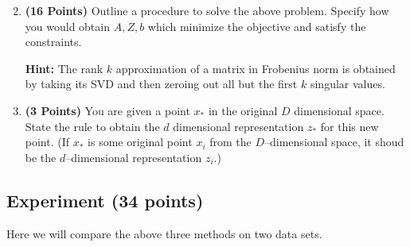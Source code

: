 \documentclass[a4paper]{article}
\theoremstyle{definition}
\begin{document}
\begin{enumerate}
	\setcounter{enumi}{1}
	\item \textbf{(16 Points)}
	      Outline a procedure to solve the above problem. Specify how you
	      would obtain $A, Z, b$ which minimize the objective and satisfy the constraints.

	      \textbf{Hint: }The rank $k$ approximation of a matrix in Frobenius norm is obtained by
	      taking its SVD and then zeroing out all but the first $k$ singular values.

	\item \textbf{(3 Points)}
	      You are given a point $x_*$ in the original $D$ dimensional space.
	      State the rule to obtain the $d$ dimensional
	      representation $z_*$ for this new point.
	      (If $x_*$ is some original point $x_i$ from the $D$--dimensional space, it shoud be the
	      $d$--dimensional representation $z_i$.)


\end{enumerate}


\subsection{Experiment (34 points)}

Here we will compare the above three methods on two data sets.
\end{document}
